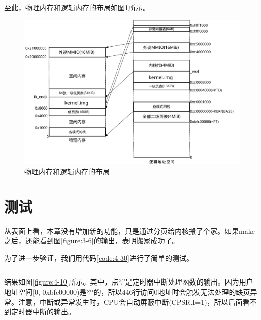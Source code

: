 \documentclass[main.tex]{subfiles}
\begin{document}
\begin{CJK*}{UTF8}{song}
\begin{code}
\label{code:4-29}
\inputminted[firstline=406,lastline=418,linenos,numbersep=5pt,frame=lines,framesep=2mm]{c}{src/chapter04/kernel/machdep.c}
\end{code}

至此，物理内存和逻辑内存的布局如图\ref{figure:4-9}所示。

\begin{figure}[htp]
\centering
\includegraphics[scale=0.4]{figures/4-9}
\caption{物理内存和逻辑内存的布局}
\label{figure:4-9}
\end{figure}

\section{测试}
从表面上看，本章没有增加新的功能，只是通过分页给内核搬了个家。如果make之后，还能看到图\ref{figure:3-6}的输出，表明搬家成功了。

\par
为了进一步验证，我们用代码\ref{code:4-30}进行了简单的测试。

\begin{code}
\label{code:4-30}
\inputminted[firstline=448,lastline=457,linenos,numbersep=5pt,frame=lines,framesep=2mm]{c}{src/chapter04/kernel/machdep.c}
\end{code}

结果如图\ref{figure:4-10}所示。其中，点“.”是定时器中断处理函数的输出。因为用户地址空间[0, 0xbfc00000)是空的，所以446行访问0地址时会触发无法处理的缺页异常。注意，中断或异常发生时，CPU会自动屏蔽中断(CPSR.I=1)，所以后面看不到定时器中断的输出。


\end{CJK*}
\end{document}
